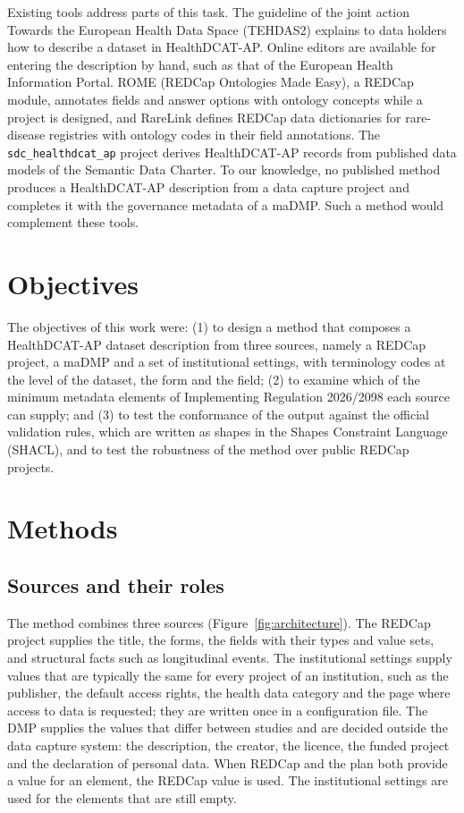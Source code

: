 \documentclass[12pt]{article}
\newcommand{\code}[1]{\texttt{#1}}
\begin{document}
Existing tools address parts of this task. The guideline of the joint action Towards
the European Health Data Space (TEHDAS2)
explains to data holders how to describe a dataset in HealthDCAT-AP.\citep{tehdas2d51}
Online editors are available for entering the description by hand, such as that of the
European Health Information Portal.\citep{hipeditor}
ROME (REDCap Ontologies Made Easy), a REDCap module, annotates fields and answer options with ontology concepts while a
project is designed,\citep{meigen2026rome} and RareLink defines REDCap data dictionaries
for rare-disease registries with ontology codes in their field annotations.%
\citep{graefe2025rarelink} The \code{sdc\_healthdcat\_ap} project derives HealthDCAT-AP
records from published data models of the Semantic Data Charter.\citep{sdchealthdcat}
To our knowledge, no published method produces a HealthDCAT-AP description from a data
capture project and completes it with the governance metadata of a
maDMP. Such a method would complement these tools.

\section{Objectives}

The objectives of this work were:
(1) to design a method that composes a HealthDCAT-AP dataset description from three
sources, namely a REDCap project, a maDMP and a set of institutional settings, with
terminology codes at the level of the dataset, the form and the field;
(2) to examine which of the minimum metadata elements of Implementing Regulation
2026/2098 each source can supply; and
(3) to test the conformance of the output against the official validation rules, which
are written as shapes in the Shapes Constraint Language (SHACL), and to test the
robustness of the method over public REDCap projects.

\section{Methods}

\subsection{Sources and their roles}

The method combines three sources (Figure~\ref{fig:architecture}). The REDCap project
supplies the title, the forms, the fields with their types and value sets, and
structural facts such as longitudinal events. The institutional settings supply values
that are typically the same for every project of an institution, such as the publisher, the
default access rights, the health data category and the page where access to data is
requested; they are written once in a configuration file. The DMP supplies the values
that differ between studies and are decided outside the data capture system: the
description, the creator, the licence, the funded project and the declaration of
personal data. When REDCap and the plan both provide a value for an element,
the REDCap value is used. The institutional settings are used for the elements that are
still empty.
\end{document}
